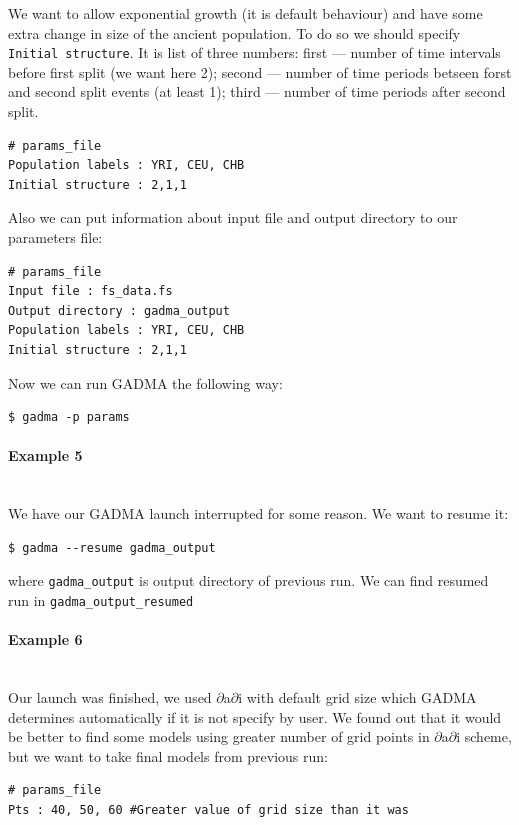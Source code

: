 \documentclass[12pt]{article}
\makeatletter
\newcommand{\dadi}{$\partial$a$\partial$i\xspace}
\newcommand{\py}[1]{\lstinline[language=Python, showstringspaces=False]@#1@}
\makeatother
\begin{document}
We want to allow exponential growth (it is default behaviour) and have some extra change in size of the ancient population. To do so we should specify \py{Initial structure}. It is list of three numbers: first --- number of time intervals before first split (we want here 2); second --- number of time periods betseen forst and second split events (at least 1); third --- number of time periods after second split.

\begin{lstlisting}
# params_file
Population labels : YRI, CEU, CHB
Initial structure : 2,1,1
\end{lstlisting}

Also we can put information about input file and output directory to our parameters file:
\begin{lstlisting}
# params_file
Input file : fs_data.fs
Output directory : gadma_output
Population labels : YRI, CEU, CHB
Initial structure : 2,1,1
\end{lstlisting}

Now we can run GADMA the following way:
\begin{lstlisting}
$ gadma -p params
\end{lstlisting}

\paragraph{Example 5}\mbox{}\\
We have our GADMA launch interrupted for some reason. We want to resume it:
\begin{lstlisting}
$ gadma --resume gadma_output
\end{lstlisting}
where \py{gadma_output} is output directory of previous run. We can find resumed run in \py{gadma_output_resumed}

\paragraph{Example 6}\mbox{}\\
Our launch was finished, we used \dadi with default grid size which GADMA determines automatically if it is not specify by user. We found out that it would be better to find some models using greater number of grid points in \dadi scheme, but we want to take final models from previous run:

\begin{lstlisting}
# params_file
Pts : 40, 50, 60 #Greater value of grid size than it was
\end{lstlisting}
\end{document}
